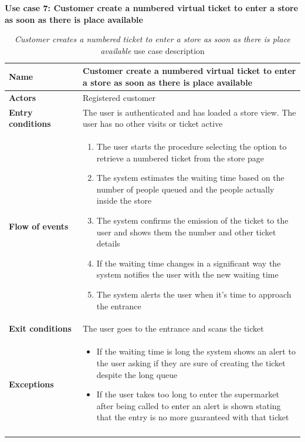 \clearpage
\textbf{Use case 7: Customer create a numbered virtual ticket to enter a store as soon as there is place available}
\smallskip
{}
\begin{longtable}{p{0.25\linewidth}p{0.75\linewidth}}
    \toprule
    \textbf{Name}             & \textbf{Customer create a numbered virtual ticket to enter a store as soon as there is place available} \\
    \midrule
    \textbf{Actors}           & Registered customer                                                                                     \\
    \midrule
    \textbf{Entry conditions} & The user is authenticated and has loaded a store view. The user has no other visits or ticket active    \\
    \midrule
    \textbf{Flow of events}   &
    \begin{enumerate}
        \item The user starts the procedure selecting the option to retrieve a numbered ticket from the store page
        \item The system estimates the waiting time based on the number of people queued and the people actually inside the store
        \item The system confirms the emission of the ticket to the user and shows them the number and other ticket details
        \item If the waiting time changes in a significant way the system notifies the user with the new waiting time
        \item The system alerts the user when it's time to approach the entrance
    \end{enumerate}                                                                                                          \\
    \midrule
    \textbf{Exit conditions}  & The user goes to the entrance and scans the ticket                                                      \\
    \midrule
    \textbf{Exceptions}       &
    \begin{itemize}
        \item If the waiting time is long the system shows an alert to the user asking if they are sure of creating the ticket despite the long queue
        \item If the user takes too long to enter the supermarket after being called to enter an alert is shown stating that the entry is no more guaranteed with that ticket

    \end{itemize}                                                                                                          \\
    \bottomrule
    \caption{\emph{Customer creates a numbered ticket to enter a store as soon as there is place available} use case description}
\end{longtable}

